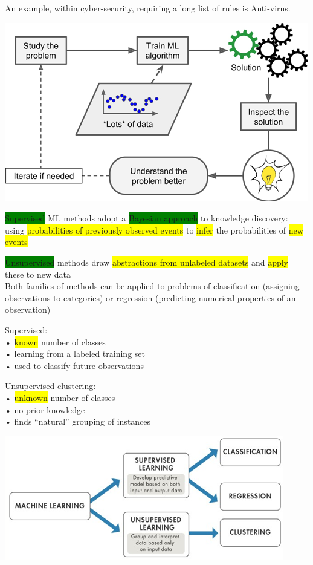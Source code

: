 \documentclass[]{project_plan}
\begin{document}
An example, within cyber-security, requiring a long list of rules is Anti-virus.

\includegraphics[width=.6\linewidth]{ml process.png}

\colorbox{green}{Supervised} ML methods adopt a \colorbox{green}{Bayesian approach} to knowledge discovery:\\
using \colorbox{yellow}{probabilities of previously observed events} to \colorbox{yellow}{infer} the probabilities of \colorbox{yellow}{new events}

\colorbox{green}{Unsupervised} methods draw \colorbox{yellow}{abstractions from unlabeled datasets} and \colorbox{yellow}{apply} these to new data\\
Both families of methods can be applied to problems of classification (assigning
observations to categories) or regression (predicting numerical properties of an observation)

Supervised:\\
• \colorbox{yellow}{known} number of classes\\
• learning from a labeled training set\\
• used to classify future observations

Unsupervised clustering:\\
• \colorbox{yellow}{unknown} number of classes\\
• no prior knowledge\\
• finds “natural” grouping of instances

\includegraphics[width=.8\linewidth]{learning ml.png}
\end{document}
